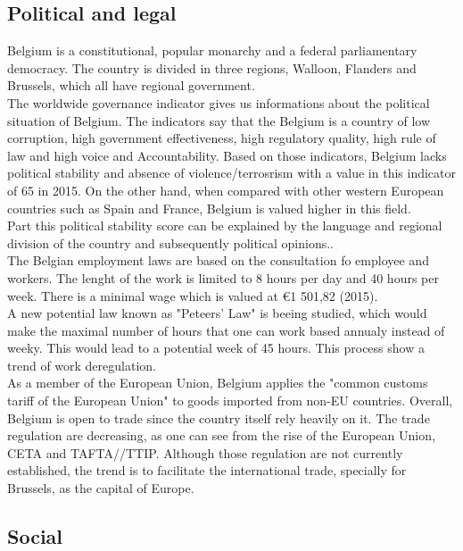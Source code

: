 \documentclass[12pt,a4paper,oneside]{book}
\begin{document}
\subsection{Political and legal}

Belgium is a constitutional, popular monarchy and a federal parliamentary democracy. The country is divided in three regions, Walloon, Flanders and Brussels, which all have regional government.\\
The worldwide governance indicator gives us informations about the political situation of Belgium. The indicators say that the Belgium is a country of low corruption, high government effectiveness, high regulatory quality, high rule of law and high voice and Accountability. Based on those indicators, Belgium lacks political stability and absence of violence/terrosrism with a value in this indicator of 65 in 2015\cite{wbgi}. On the other hand, when compared with other western European countries such as Spain and France, Belgium is valued higher in this field.\\
Part this political stability score can be explained by the language and regional division of the country and subsequently political opinions.\cite{bailo2016political}.\\

The Belgian employment laws are based on the consultation fo employee and workers. The lenght of the work is limited to 8 hours per day and 40 hours per week. There is a minimal wage which is valued at \euro 1 501,82 (2015)\cite{eurostatmw}.\\
A new potential law known as "Peteers' Law" is beeing studied, which would make the maximal number of hours that one can work based annualy instead of weeky. This would lead to a potential week of 45 hours.\cite{rtlp} This process show a trend of work deregulation.\\

As a member of the European Union, Belgium applies the "common customs tariff of the European Union" to goods imported from non-EU countries. Overall, Belgium is open to trade since the country itself rely heavily on it. The trade regulation are decreasing, as one can see from the rise of the European Union, CETA and TAFTA//TTIP. Although those regulation are not currently established, the trend is to facilitate the international trade, specially for Brussels, as the capital of Europe.\\

\subsection{Social}
\end{document}
